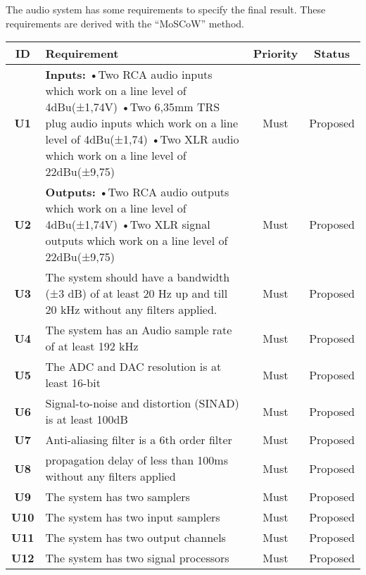 The audio system has some requirements to specify the final result. These requirements are derived with the “MoSCoW” method.
\begin{longtable}{|c|p{10cm}|c|c|}
	\hline
	\textbf{ID} & \textbf{Requirement} & \textbf{Priority} & \textbf{Status}\\ \hline 
	\textbf{U1} & \textbf{Inputs:} \newline
	•Two RCA audio inputs which work on a line level of 4dBu(±1,74V)\newline
	•Two 6,35mm TRS plug audio inputs which work on a line level of 4dBu(±1,74)\newline
	•Two XLR audio which work on a line level of 22dBu(±9,75) 																	& Must	 & Proposed\\ \hline
	\textbf{U2} & \textbf{Outputs:} \newline
	•Two RCA audio outputs which work on a line level of 4dBu(±1,74V)\newline
	•Two XLR signal outputs which work on a line level of 22dBu(±9,75)
	 & Must & Proposed\\ \hline
	\textbf{U3} &The system should have a bandwidth (±3 dB) of at least 20 Hz up and till 20 kHz without any filters applied. 	& Must   & Proposed\\ \hline
	\textbf{U4} &The system has an Audio sample rate of at least 192 kHz 														& Must   & Proposed\\ \hline
	\textbf{U5} &The ADC and DAC resolution is at least 16-bit 																	& Must   & Proposed\\ \hline
	\textbf{U6} &Signal-to-noise and distortion (SINAD) is at least 100dB  														& Must   & Proposed\\ \hline
	\textbf{U7} &Anti-aliasing filter is a 6th order filter										 								& Must   & Proposed\\ \hline
	\textbf{U8} &propagation delay of less than 100ms without any filters applied												& Must   & Proposed\\ \hline
	\textbf{U9} &The system has two samplers											 										& Must   & Proposed\\ \hline
	\textbf{U10} &The system has two input samplers 																				& Must   & Proposed\\ \hline
	\textbf{U11}&The system has two output channels														 						& Must   & Proposed\\ \hline
	\textbf{U12}&The system has two signal processors														 					& Must   & Proposed\\ \hline

\end{longtable}
